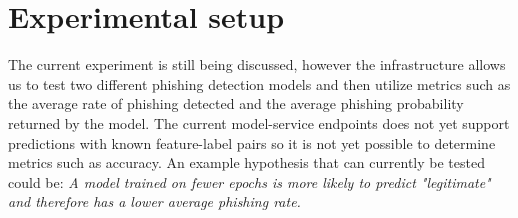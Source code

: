 \section{Experimental setup}
The current experiment is still being discussed, however the infrastructure allows us to test two different phishing detection models and then utilize metrics such as the average rate of phishing detected and the average phishing probability returned by the model. The current model-service endpoints does not yet support predictions with known feature-label pairs so it is not yet possible to determine metrics such as accuracy. An example hypothesis that can currently be tested could be: \textit{A model trained on fewer epochs is more likely to predict "legitimate" and therefore has a lower average phishing rate.}

